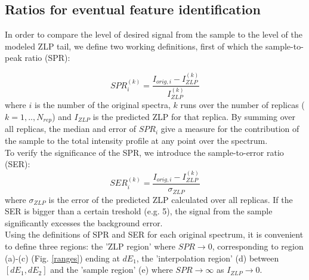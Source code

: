 \subsection{Ratios for eventual feature identification}

In order to compare the level of desired signal from the sample to the level of the modeled ZLP tail, we define two working definitions, first of which the sample-to-peak ratio (SPR):

\begin{equation}
    SPR_{i}^{(k)} = \frac{I_{orig, i} - I_{ZLP}^{(k)}}{I_{ZLP}^{(k)}}
\end{equation}
where $i$ is the number of the original spectra, $k$ runs over the number of replicas ($k=1,..,N_{rep}$) and $I_{ZLP}$ is the predicted ZLP for that replica. By summing over all replicas, the median and error of $SPR_i$ give a measure for the contribution of the sample to the total intensity profile at any point over the spectrum. \\

To verify the significance of the SPR, we introduce the sample-to-error ratio (SER):
\begin{equation}
    SER_{i}^{(k)} = \frac{I_{orig, i} - I_{ZLP}^{(k)}}{\sigma_{ZLP}}
\end{equation}
where $\sigma_{ZLP}$ is the error of the predicted ZLP calculated over all replicas. 
If the SER is bigger than a certain treshold (e.g. 5), the signal from the sample significantly excesses the background error. \\
Using the definitions of SPR and SER for each original spectrum, it is convenient to define three regions: the 'ZLP region' where $SPR \rightarrow0$, corresponding to region (a)-(c) (Fig. \ref{ranges}) ending at $dE_1$, the 'interpolation region' (d) between $[dE_1, dE_2]$ and the 'sample region' (e) where $SPR\rightarrow\infty$ as $I_{ZLP}\rightarrow0$.
